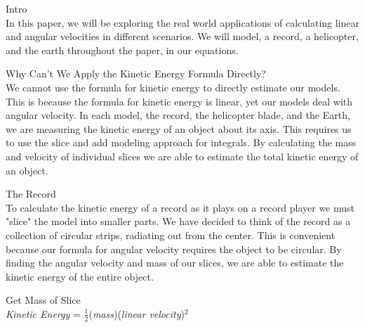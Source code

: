 \documentclass[a4paper, 11pt, oneside]{book} %
\begin{document}
\pagebreak{}
\centering %
{\LARGE Intro\\} %
\vspace{0.5\baselineskip} %
In this paper, we will be exploring the real world applications of calculating linear and angular velocities in different scenarios. We will model, a record, a helicopter, and the earth throughout the paper, in our equations.
\vspace{1.0\baselineskip} %

{\LARGE Why Can't We Apply the Kinetic Energy Formula Directly? \\} %
\vspace{0.5\baselineskip} %
We cannot use the formula for kinetic energy to directly estimate our models. This is because the formula for kinetic energy is linear, yet our models deal with angular velocity. In each model, the record, the helicopter blade, and the Earth, we are measuring the kinetic energy of an object about its axis. This requires us to use the slice and add modeling approach for integrals. By calculating the mass and velocity of individual slices we are able to estimate the total kinetic energy of an object.

\vspace{1.0\baselineskip} %

{\LARGE The Record \\} %
\vspace{0.5\baselineskip} %
To calculate the kinetic energy of a record as it plays on a record player we must "slice" the model into smaller parts. We have decided to think of the record as a collection of circular strips, radiating out from the center. This is convenient because our formula for angular velocity requires the object to be circular. By finding the angular velocity and mass of our slices, we are able to estimate the kinetic energy of the entire object. 

\vspace{0.5\baselineskip} %
{\LARGE Get Mass of Slice \\} %
\vspace{0.5\baselineskip} %
\textit{Kinetic Energy} = $\frac{1}{2}$(\textit{mass})(\textit{linear velocity})$^2$
\vspace{0.5\baselineskip} %
\end{document}
